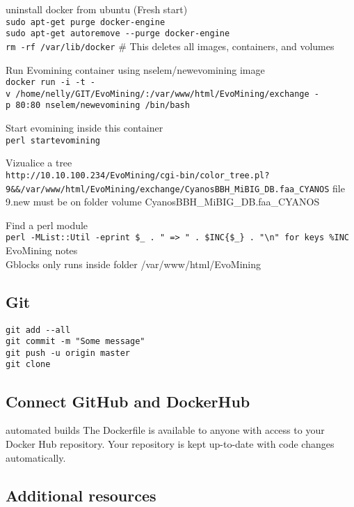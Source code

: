 \documentclass[]{article}
\begin{document}
uninstall docker from ubuntu (Fresh start)\\
\texttt{sudo\ apt-get\ purge\ docker-engine}\\
\texttt{sudo\ apt-get\ autoremove\ -\/-purge\ docker-engine}\\
\texttt{rm\ -rf\ /var/lib/docker} \# This deletes all images,
containers, and volumes

Run Evomining container using nselem/newevomining image\\
\texttt{docker\ run\ -i\ -t\ -v\ /home/nelly/GIT/EvoMining/:/var/www/html/EvoMining/exchange\ -p\ 80:80\ nselem/newevomining\ /bin/bash}

Start evomining inside this container\\
\texttt{perl\ startevomining}

Vizualice a tree\\
\texttt{http://10.10.100.234/EvoMining/cgi-bin/color\_tree.pl?9\&\&/var/www/html/EvoMining/exchange/CyanosBBH\_MiBIG\_DB.faa\_CYANOS}
file 9.new must be on folder volume CyanosBBH\_MiBIG\_DB.faa\_CYANOS

Find a perl module\\
\texttt{perl\ -MList::Util\ -e\textquotesingle{}print\ \$\_\ .\ "\ =\textgreater{}\ "\ .\ \$INC\{\$\_\}\ .\ "\textbackslash{}n"\ for\ keys\ \%INC\textquotesingle{}}
EvoMining notes\\
Gblocks only runs inside folder /var/www/html/EvoMining

\subsection{Git}\label{git}

\texttt{git\ add\ -\/-all}\\
\texttt{git\ commit\ -m\ "Some\ message"}\\
\texttt{git\ push\ -u\ origin\ master}\\
\texttt{git\ clone}

\subsection{Connect GitHub and
DockerHub}\label{connect-github-and-dockerhub}

automated builds The Dockerfile is available to anyone with access to
your Docker Hub repository. Your repository is kept up-to-date with code
changes automatically.

\subsection{Additional resources}\label{additional-resources}
\end{document}
